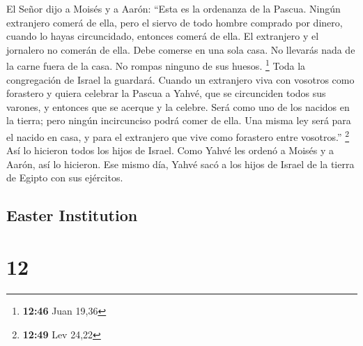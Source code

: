\begin{paracol}{2}
 El Señor dijo a Moisés y a Aarón: ``Esta es la ordenanza
de la Pascua. Ningún extranjero comerá de ella,  pero el
siervo de todo hombre comprado por dinero, cuando lo hayas circuncidado,
entonces comerá de ella.  El extranjero y el jornalero no
comerán de ella.  Debe comerse en una sola casa. No
llevarás nada de la carne fuera de la casa. No rompas ninguno de sus
huesos. \footnote{\textbf{12:46} Juan 19,36}  Toda la
congregación de Israel la guardará.  Cuando un extranjero
viva con vosotros como forastero y quiera celebrar la Pascua a Yahvé,
que se circunciden todos sus varones, y entonces que se acerque y la
celebre. Será como uno de los nacidos en la tierra; pero ningún
incircunciso podrá comer de ella.  Una misma ley será
para el nacido en casa, y para el extranjero que vive como forastero
entre vosotros.'' \footnote{\textbf{12:49} Lev 24,22} 
Así lo hicieron todos los hijos de Israel. Como Yahvé les ordenó a
Moisés y a Aarón, así lo hicieron.  Ese mismo día, Yahvé
sacó a los hijos de Israel de la tierra de Egipto con sus ejércitos.

\switchcolumn
\begin{otherlanguage}{english}

\hypertarget{easter-institution}{%
\subsection{Easter Institution}\label{easter-institution}}

\hypertarget{section-23}{%
\section{12}\label{section-23}}


\end{otherlanguage}
\end{paracol}
